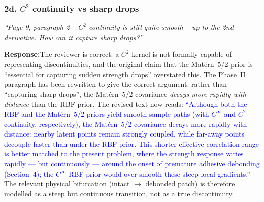 \documentclass[11pt,a4paper]{article}
\newcommand{\new}[1]{\textcolor{blue}{#1}}
\newcommand{\rev}[1]{\par\noindent\textit{\small #1}\par\smallskip}
\newcommand{\resp}{\par\noindent\textbf{Response:}\space}
\begin{document}
\subsubsection*{2d. $C^2$ continuity vs sharp drops}
\rev{``Page 9, paragraph 2 -- $C^2$ continuity is still quite smooth -- up to the 2nd derivative. How can it capture sharp drops?''}
\resp The reviewer is correct: a $C^2$ kernel is not formally capable of representing discontinuities, and the original claim that the Mat\'ern~5/2 prior is ``essential for capturing sudden strength drops'' overstated this. The Phase~II paragraph has been rewritten to give the correct argument: rather than ``capturing sharp drops'', the Mat\'ern~5/2 covariance \emph{decays more rapidly with distance} than the RBF prior. The revised text now reads: \new{``Although both the RBF and the Mat\'ern~5/2 priors yield smooth sample paths (with $C^{\infty}$ and $C^2$ continuity, respectively), the Mat\'ern~5/2 covariance decays more rapidly with distance: nearby latent points remain strongly coupled, while far-away points decouple faster than under the RBF prior. This shorter effective correlation range is better matched to the present problem, where the strength response varies rapidly --- but continuously --- around the onset of premature adhesive debonding (Section~4); the $C^{\infty}$ RBF prior would over-smooth these steep local gradients.''} The relevant physical bifurcation (intact $\rightarrow$ debonded patch) is therefore modelled as a steep but continuous transition, not as a true discontinuity.
\end{document}
